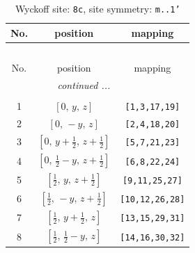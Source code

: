 \documentclass[fleqn,8pt]{jsarticle}
\begin{document}
\begin{longtable}{ccc}
\caption{Wyckoff site: {\tt 8c}, site symmetry: {\tt m..1'}}
 \\
 \hline \hline
No. & position & mapping \\ \hline \endfirsthead

\multicolumn{2}{l}{\tablename\ \thetable{}} \\
 \hline \hline
No. & position & mapping \\ \hline \endhead

 \hline \hline
\multicolumn{2}{r}{\footnotesize\it continued ...} \\ \endfoot

 \hline \hline
\multicolumn{2}{r}{} \\ \endlastfoot

1 & $\left[ 0,\, y,\, z \right]$ & {\tt [1,3,17,19]} \\ \hline
2 & $\left[ 0,\, - y,\, z \right]$ & {\tt [2,4,18,20]} \\ \hline
3 & $\left[ 0,\, y + \frac{1}{2},\, z + \frac{1}{2} \right]$ & {\tt [5,7,21,23]} \\ \hline
4 & $\left[ 0,\, \frac{1}{2} - y,\, z + \frac{1}{2} \right]$ & {\tt [6,8,22,24]} \\ \hline
5 & $\left[ \frac{1}{2},\, y,\, z + \frac{1}{2} \right]$ & {\tt [9,11,25,27]} \\ \hline
6 & $\left[ \frac{1}{2},\, - y,\, z + \frac{1}{2} \right]$ & {\tt [10,12,26,28]} \\ \hline
7 & $\left[ \frac{1}{2},\, y + \frac{1}{2},\, z \right]$ & {\tt [13,15,29,31]} \\ \hline
8 & $\left[ \frac{1}{2},\, \frac{1}{2} - y,\, z \right]$ & {\tt [14,16,30,32]} \\
\end{longtable}
\renewcommand{\arraystretch}{1.2}
\end{document}
